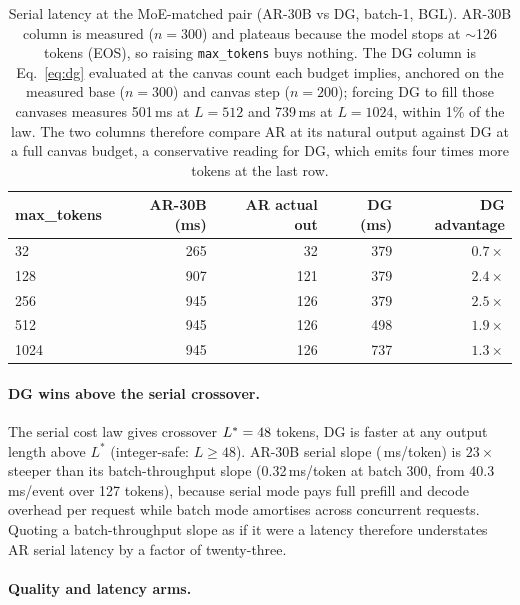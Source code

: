 \begin{table}[h]
\centering
\caption{Serial latency at the MoE-matched pair (AR-30B vs DG,
batch-1, BGL). AR-30B column is measured ($n{=}300$) and plateaus
because the model stops at $\sim$126 tokens (EOS), so raising
\texttt{max\_tokens} buys nothing. The DG column is Eq.~\ref{eq:dg}
evaluated at the canvas count each budget implies, anchored on the
measured base ($n{=}300$) and canvas step ($n{=}200$); forcing DG to
fill those canvases measures 501\,ms at $L{=}512$ and 739\,ms at
$L{=}1024$, within 1\% of the law. The two columns therefore compare
AR at its natural output against DG at a full canvas budget, a
conservative reading for DG, which emits four times more tokens at the
last row.}
\label{tab:niche}
\begin{tabular}{@{}lrrrr@{}}
\toprule
max\_tokens & AR-30B (ms) & AR actual out & DG (ms) & DG advantage \\
\midrule
32   & 265  & 32  & 379 & $0.7\times$ \\
128  & 907  & 121 & 379 & $2.4\times$ \\
256  & 945  & 126 & 379 & $2.5\times$ \\
512  & 945  & 126 & 498 & $1.9\times$ \\
1024 & 945  & 126 & 737 & $1.3\times$ \\
\bottomrule
\end{tabular}
\end{table}

\paragraph{DG wins above the serial crossover.}

The serial cost law gives crossover $L^{*} = 48$ tokens, DG
is faster at any output length above $L^{*}$ (integer-safe: $L \geq 48$).
AR-30B serial slope (\arSlope\,ms/token) is $23\times$ steeper than
its batch-throughput slope (0.32\,ms/token at batch 300, from
40.3\,ms/event over 127 tokens), because serial mode pays full prefill
and decode overhead per request while batch mode amortises across
concurrent requests. Quoting a batch-throughput slope as if it were a
latency therefore understates AR serial latency by a factor of
twenty-three.

\paragraph{Quality and latency arms.}


